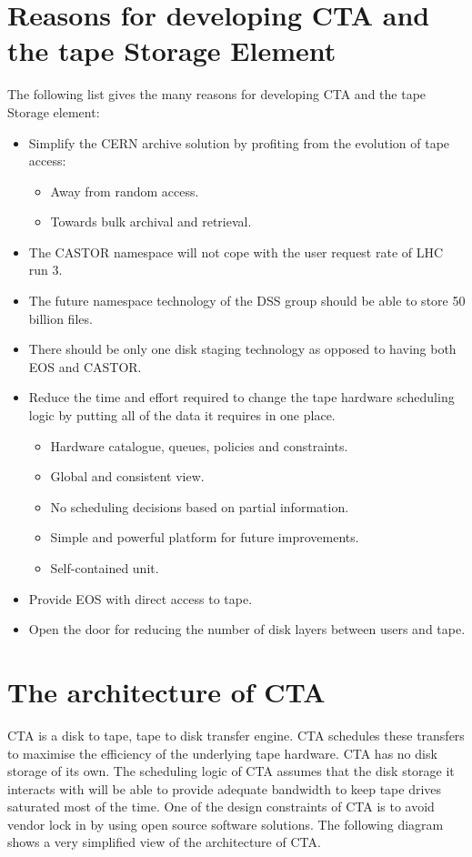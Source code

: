 \documentclass{article}
\begin{document}
\newpage
\section{Reasons for developing CTA and the tape Storage Element}
The following list gives the many reasons for developing CTA and the tape Storage element:
\begin{itemize}
  \item Simplify the CERN archive solution by profiting from the evolution of tape access:
  \begin{itemize}
  	\item Away from random access.
  	\item Towards bulk archival and retrieval.
  \end{itemize}
  \item The CASTOR namespace will not cope with the user request rate of LHC run 3.
  \item The future namespace technology of the DSS group should be able to store 50 billion files.
  \item There should be only one disk staging technology as opposed to having both EOS and CASTOR.
  \item Reduce the time and effort required to change the tape hardware scheduling logic by putting all of the data it requires in one place.
  \begin{itemize}
  	\item Hardware catalogue, queues, policies and constraints.
  	\item Global and consistent view.
	\item No scheduling decisions based on partial information.
	\item Simple and powerful platform for future improvements.
	\item Self-contained unit.
  \end{itemize}
  \item Provide EOS with direct access to tape.
  \item Open the door for reducing the number of disk layers between users and tape.
\end{itemize}

\newpage
\section{The architecture of CTA}
CTA is a disk to tape, tape to disk transfer engine.  CTA schedules these transfers to maximise the efficiency of the underlying tape hardware.  CTA has no disk storage of its own.  The scheduling logic of CTA assumes that the disk storage it interacts with will be able to provide adequate bandwidth to keep tape drives saturated most of the time. One of the design constraints of CTA is to avoid vendor lock in by using open source software solutions.  The following diagram shows a very simplified view of the architecture of CTA.
\end{document}
